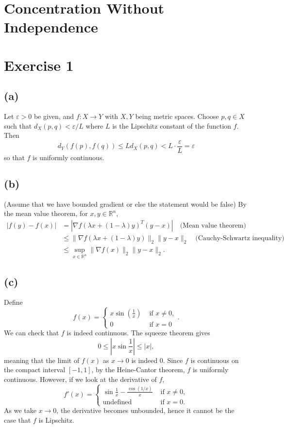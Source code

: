 \section{Concentration Without Independence}


\section*{Exercise 1}
\subsection*{(a)}
Let $\varepsilon > 0$ be given, and $f:X \to Y$ with $X, Y$ being metric spaces. Choose $p, q \in X$ such that 
$d_X(p, q) < \varepsilon / L$ where $L$ is the Lipschitz constant of the function $f$. Then 
\[ d_Y(f(p), f(q)) \leq L d_X(p, q) < L \cdot \frac{\varepsilon}{L} = \varepsilon \]
so that $f$ is uniformly continuous.

\subsection*{(b)}
(Assume that we have bounded gradient or else the statement would be false) By the mean value theorem, 
for $x, y \in \mathbb{R}^n$, 
\begin{align*}
	|f(y) - f(x)| 
	&= |\nabla f(\lambda x + (1 - \lambda)y)^T (y - x)| \quad \text{(Mean value theorem)} \\
	&\leq \lVert \nabla f(\lambda x + (1 - \lambda) y) \rVert_{2} \lVert y - x \rVert_{2} \quad 
	\text{(Cauchy-Schwartz inequality)} \\
	&\leq \sup_{x \in \mathbb{R}^n} \lVert \nabla f(x) \rVert_{2} \lVert y - x \rVert_{2}.
\end{align*}

\subsection*{(c)}
Define 
\[ f(x) = \begin{cases}
	x \sin{\left( \frac{1}{x} \right)} &\text{ if } x \neq 0, \\
	0 &\text{ if } x = 0
\end{cases}. \]
We can check that $f$ is indeed continuous. The squeeze theorem gives
\[ 0 \leq \left| x \sin{\frac{1}{x}} \right| \leq |x|, \]
meaning that the limit of $f(x)$ as $x \to 0$ is indeed 0.
Since $f$ is continuous on the compact interval $[-1, 1]$, by the Heine-Cantor theorem, $f$ is uniformly 
continuous. However, if we look at the derivative of $f$, 
\[ f'(x) = \begin{cases}
	\sin{\frac{1}{x}} - \frac{\cos{(1/x)}}{x} &\text{ if } x \neq 0, \\
	\text{undefined} &\text{ if } x = 0.
\end{cases} \]
As we take $x \to 0$, the derivative becomes unbounded, hence it cannot be the case that $f$ is Lipschitz.

